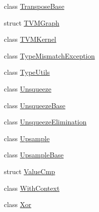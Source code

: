 \begin{DoxyCompactItemize}
class \mbox{\hyperlink{classonnxruntime_1_1TransposeBase}{Transpose\+Base}}
\item 
struct \mbox{\hyperlink{structonnxruntime_1_1TVMGraph}{T\+V\+M\+Graph}}
\item 
class \mbox{\hyperlink{classonnxruntime_1_1TVMKernel}{T\+V\+M\+Kernel}}
\item 
class \mbox{\hyperlink{classonnxruntime_1_1TypeMismatchException}{Type\+Mismatch\+Exception}}
\item 
class \mbox{\hyperlink{classonnxruntime_1_1TypeUtils}{Type\+Utils}}
\item 
class \mbox{\hyperlink{classonnxruntime_1_1Unsqueeze}{Unsqueeze}}
\item 
class \mbox{\hyperlink{classonnxruntime_1_1UnsqueezeBase}{Unsqueeze\+Base}}
\item 
class \mbox{\hyperlink{classonnxruntime_1_1UnsqueezeElimination}{Unsqueeze\+Elimination}}
\item 
class \mbox{\hyperlink{classonnxruntime_1_1Upsample}{Upsample}}
\item 
class \mbox{\hyperlink{classonnxruntime_1_1UpsampleBase}{Upsample\+Base}}
\item 
struct \mbox{\hyperlink{structonnxruntime_1_1ValueCmp}{Value\+Cmp}}
\item 
class \mbox{\hyperlink{classonnxruntime_1_1WithContext}{With\+Context}}
\item 
class \mbox{\hyperlink{classonnxruntime_1_1Xor}{Xor}}
\end{DoxyCompactItemize}
